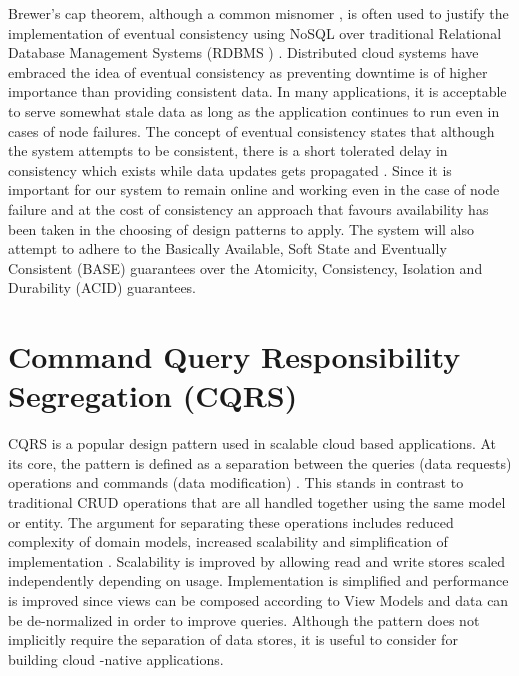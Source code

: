 Brewer's cap theorem, although a common misnomer \cite{Brewer2012}, is often used to justify the implementation of eventual consistency using NoSQL over traditional Relational Database Management Systems (RDBMS ) \cite{Wilder2012-so}. Distributed cloud systems have embraced the idea of eventual consistency as preventing downtime is of higher importance than providing consistent data. In many applications, it is acceptable to serve somewhat stale data as long as the application continues to run even in cases of node failures. The concept of eventual consistency states that although the system attempts to be consistent, there is a short tolerated delay in consistency which exists while data updates gets propagated \cite{Wilder2012-so}. Since it is important for our system to remain online and working even in the case of node failure and at the cost of consistency an approach that favours availability has been taken in the choosing of design patterns to apply. The system will also attempt to adhere to the Basically Available, Soft State and Eventually Consistent (BASE) guarantees over the Atomicity, Consistency, Isolation and Durability (ACID) guarantees.
 
 
 \section{Command Query Responsibility Segregation (CQRS)}
 
CQRS is a popular design pattern used in scalable cloud based applications. At its core, the pattern is defined as a separation between the queries (data requests) operations and commands (data modification) \cite{Swanson}. This stands in contrast to traditional CRUD operations that are all handled together using the same model or entity. The argument for separating these operations includes reduced complexity of domain models, increased scalability and simplification of implementation \cite{Swanson}. Scalability is improved by allowing read and write stores scaled independently depending on usage. Implementation is simplified and performance is improved since views can be composed according to View Models and data can be de-normalized in order to improve queries. Although the pattern does not implicitly require the separation of data stores, it is useful to consider for building cloud -native applications. 
 

